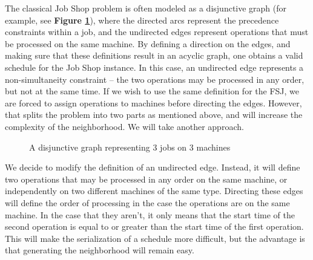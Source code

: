\documentclass[a4paper,10pt]{article}
\begin{document}
The classical Job Shop problem is often modeled as a disjunctive graph (for example, see \textbf{Figure \ref{fig:disjunctivegraph}}), where the directed arcs represent the precedence constraints within a job, and the undirected edges represent operations that must be processed on the same machine. By defining a direction on the edges, and making sure that these definitions result in an acyclic graph, one obtains a valid schedule for the Job Shop instance. In this case, an undirected edge represents a non-simultaneity constraint -- the two operations may be processed in any order, but not at the same time. If we wish to use the same definition for the FSJ, we are forced to assign operations to machines before directing the edges. However, that splits the problem into two parts as mentioned above, and will increase the complexity of the neighborhood. We will take another approach.

\begin{figure}[h]
\centering
{}
\caption{A disjunctive graph representing 3 jobs on 3 machines}
\label{fig:disjunctivegraph}
\end{figure}

We decide to modify the definition of an undirected edge. Instead, it will define two operations that may be processed in any order on the same machine, or independently on two different machines of the same type. Directing these edges will define the order of processing in the case the operations are on the same machine. In the case that they aren't, it only means that the start time of the second operation is equal to or greater than the start time of the first operation. This will make the serialization of a schedule more difficult, but the advantage is that generating the neighborhood will remain easy.
\end{document}
